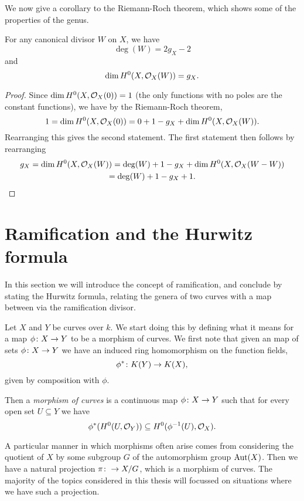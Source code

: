 We now give a corollary to the Riemann-Roch theorem, which shows some of the properties of the genus.

    \begin{cor}\label{dim=gc}
    For any canonical divisor $W$ on $X$, we have 
        \[
        \deg(W) = 2g_X-2
        \]
    and 
        \[
        \dim H^0(X,{\cal O}_X(W)) = g_X.
        \]
    \end{cor}
    \begin{proof}
    Since $\dim H^0(X,{\cal O}_X(0)) = 1$ (the only functions with no poles are the constant functions), we have by the Riemann-Roch theorem, 
        \[
        1= \dim H^0(X,{\cal O}_X(0)) = 0 + 1 -g_X + \dim H^0(X,{\cal O}_X(W)).
        \]
    Rearranging this gives the second statement.
    The first statement then follows by rearranging
        \begin{multline*}
        g_X = \dim H^0(X,{\cal O}_X(W)) = \deg(W) + 1 -g_X +  \dim H^0(X,{\cal O}_X(W-W))\\ = \deg(W) + 1 -g_X + 1.
        \end{multline*}
    \end{proof}

\section{Ramification and the Hurwitz formula}

In this section we will introduce the concept of ramification, and conclude by stating the Hurwitz formula, relating the genera of two curves with a map between via the ramification divisor.



Let $X$ and $Y$ be curves over $k$.
We start doing this by defining what it means for a map $\phi \colon X \rightarrow Y$ to be a morphism of curves.
We first note that given an map of sets $\phi \colon X \rightarrow Y$ we have an induced ring homomorphism on the function fields,
    \[
    \phi^* \colon K(Y) \rightarrow K(X),
    \]
given by composition with $\phi$.

Then a \emph{morphism of curves} is a continuous map $\phi \colon X \rightarrow Y$ such that for every open set $U \subseteq Y$ we have
    \[
    \phi^*(H^0(U,{\cal O}_Y)) \subseteq H^0(\phi^{-1}(U),{\cal O}_X).
    \]

A particular manner in which morphisms often arise comes from considering the quotient of $X$ by some subgroup $G$ of the automorphism group $\operatorname{Aut}(X)$.
Then we have a natural projection $\pi \colon \rightarrow X/G$, which is a morphism of curves.
The majority of the topics considered in this thesis will focussed on situations where we have such a projection.


